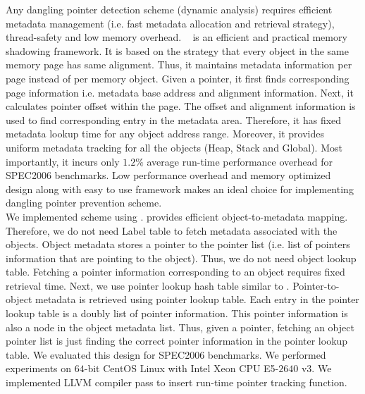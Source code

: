 Any dangling pointer detection scheme (dynamic analysis) requires efficient metadata management (i.e. fast metadata allocation and retrieval strategy), thread-safety and low memory overhead. \metalloc{}~\cite{istvan2016metalloc} is an efficient and practical memory shadowing framework. It is based on the strategy that every object in the same memory page has same alignment. Thus, it maintains metadata information per page instead of per memory object. Given a pointer, it first finds corresponding page information i.e. metadata base address and alignment information. Next, it  calculates pointer offset within the page. The offset and alignment information is used to find corresponding entry in the metadata area. Therefore, it has fixed metadata lookup time for any object address range. Moreover, it provides uniform metadata tracking for all the objects (Heap, Stack and Global). Most importantly, it incurs only $1.2\%$ average run-time performance overhead for SPEC2006 benchmarks. Low performance overhead and memory optimized design along with easy to use framework makes \metalloc{} an ideal choice for implementing dangling pointer prevention scheme. \\

We implemented \freesentry{} scheme using \metalloc{}. \metalloc{} provides efficient object-to-metadata mapping. Therefore, we do not need Label table to fetch metadata associated with the objects. Object metadata stores a pointer to the pointer list (i.e. list of pointers information that are pointing to the object). Thus, we do not need object lookup table. Fetching a pointer information corresponding to an object requires fixed retrieval time. Next, we use pointer lookup hash table similar to \freesentry{}. Pointer-to-object metadata is retrieved using pointer lookup table. Each entry in the pointer lookup table is a doubly list of pointer information. This pointer information is also a node in the object metadata list. Thus, given a pointer, fetching an object pointer list is just finding the correct pointer information in the pointer lookup table. We evaluated this design for SPEC2006 benchmarks. We performed experiments on $64$-bit CentOS Linux with Intel Xeon CPU E5-$2640$ v$3$. We implemented LLVM compiler pass to insert run-time pointer tracking function. \\ 

